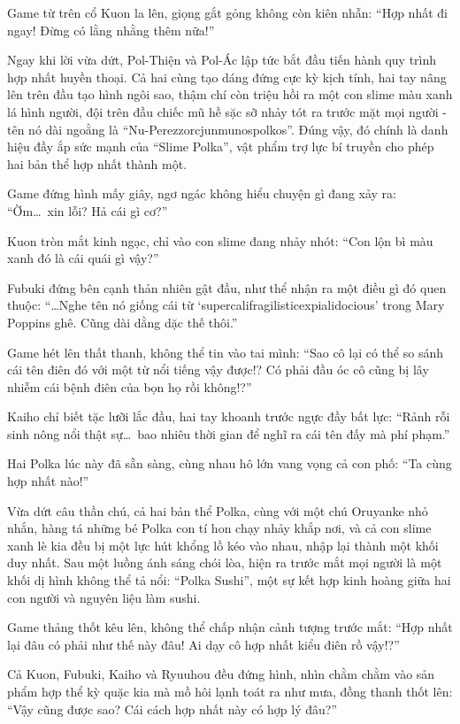 \documentclass[../main.tex]{subfiles}
\begin{document}
Game từ trên cổ Kuon la lên, giọng gắt gỏng không còn kiên nhẫn: ``Hợp nhất đi ngay! Đừng có lằng nhằng thêm nữa!''

Ngay khi lời vừa dứt, Pol-Thiện và Pol-Ác lập tức bắt đầu tiến hành quy trình hợp nhất huyền thoại. Cả hai cùng tạo dáng đứng cực kỳ kịch tính, hai tay nâng lên trên đầu tạo hình ngôi sao, thậm chí còn triệu hồi ra một con slime màu xanh lá hình người, đội trên đầu chiếc mũ hề sặc sỡ nhảy tót ra trước mặt mọi người - tên nó dài ngoằng là ``Nu-Perezzorcjunmunospolkos''. Đúng vậy, đó chính là danh hiệu đầy ắp sức mạnh của ``Slime Polka'', vật phẩm trợ lực bí truyền cho phép hai bản thể hợp nhất thành một.

Game đứng hình mấy giây, ngơ ngác không hiểu chuyện gì đang xảy ra: ``Ờm\dots\ xin lỗi? Hả cái gì cơ?''

Kuon tròn mắt kinh ngạc, chỉ vào con slime đang nhảy nhót: ``Con lộn bì màu xanh đó là cái quái gì vậy?''

Fubuki đứng bên cạnh thản nhiên gật đầu, như thể nhận ra một điều gì đó quen thuộc: ``\dots Nghe tên nó giống cái từ `supercalifragilisticexpialidocious' trong Mary Poppins ghê. Cũng dài dằng dặc thế thôi.''

Game hét lên thất thanh, không thể tin vào tai mình: ``Sao cô lại có thể so sánh cái tên điên đó với một từ nổi tiếng vậy được!? Có phải đầu óc cô cũng bị lây nhiễm cái bệnh điên của bọn họ rồi không!?''

Kaiho chỉ biết tặc lưỡi lắc đầu, hai tay khoanh trước ngực đầy bất lực: ``Rảnh rỗi sinh nông nổi thật sự\dots\ bao nhiêu thời gian để nghĩ ra cái tên đấy mà phí phạm.''

Hai Polka lúc này đã sẵn sàng, cùng nhau hô lớn vang vọng cả con phố: ``Ta cùng hợp nhất nào!''

Vừa dứt câu thần chú, cả hai bản thể Polka, cùng với một chú Oruyanke nhỏ nhắn, hàng tá những bé Polka con tí hon chạy nhảy khắp nơi, và cả con slime xanh lè kia đều bị một lực hút khổng lồ kéo vào nhau, nhập lại thành một khối duy nhất. Sau một luồng ánh sáng chói lòa, hiện ra trước mắt mọi người là một khối dị hình không thể tả nổi: ``Polka Sushi'', một sự kết hợp kinh hoàng giữa hai con người và nguyên liệu làm sushi.


Game thảng thốt kêu lên, không thể chấp nhận cảnh tượng trước mắt: ``Hợp nhất lại đâu có phải như thế này đâu! Ai dạy cô hợp nhất kiểu điên rồ vậy!?''

Cả Kuon, Fubuki, Kaiho và Ryuuhou đều đứng hình, nhìn chằm chằm vào sản phẩm hợp thể kỳ quặc kia mà mồ hôi lạnh toát ra như mưa, đồng thanh thốt lên: ``Vậy cũng được sao? Cái cách hợp nhất này có hợp lý đâu?''
\end{document}
